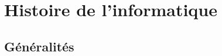 \documentclass[a4paper, 11pt, twoside, fleqn]{memoir}
\begin{document}

	
\chapter{Histoire de l'informatique}
\ChapFrame

\section{Généralités}
	
	
	
	
\end{document}

